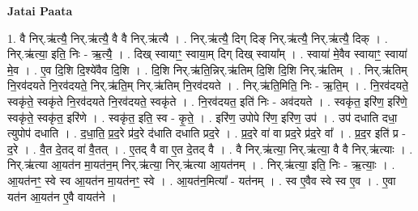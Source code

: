 \documentclass[17pt]{extarticle}
\begin{document}
\textbf{Jatai Paata} \newline

1. वै निर्.ऋ॑त्यै॒ निर्.ऋ॑त्यै॒ वै वै निर्.ऋ॑त्यै । . निर्.ऋ॑त्यै॒ दिग् दिङ् निर्.ऋ॑त्यै॒ निर्.ऋ॑त्यै॒ दिक् । . निर्.ऋ॑त्या॒ इति॒ निः - ऋ॒त्यै॒ । . दिख् स्वायाꣳ॒॒ स्वाया॒म् दिग् दिख् स्वाया᳚म् । . स्वाया॑ मे॒वैव स्वायाꣳ॒॒ स्वाया॑ मे॒व । . ए॒व दि॒शि दि॒श्ये॑वैव दि॒शि । . दि॒शि निर्.ऋ॑ति॒न्निर्.ऋ॑तिम् दि॒शि दि॒शि निर्.ऋ॑तिम् । . निर्.ऋ॑तिम् नि॒रव॑दयते नि॒रव॑दयते॒ निर्.ऋ॑ति॒म् निर्.ऋ॑तिम् नि॒रव॑दयते । . निर्.ऋ॑ति॒मिति॒ निः - ऋ॒ति॒म् । . नि॒रव॑दयते॒ स्वकृ॑ते॒ स्वकृ॑ते नि॒रव॑दयते नि॒रव॑दयते॒ स्वकृ॑ते । . नि॒रव॑दयत॒ इति॑ निः - अव॑दयते । . स्वकृ॑त॒ इरि॑ण॒ इरि॑णे॒ स्वकृ॑ते॒ स्वकृ॑त॒ इरि॑णे । . स्वकृ॑त॒ इति॒ स्व - कृ॒ते॒ । . इरि॑ण॒ उपोपे रि॑ण॒ इरि॑ण॒ उप॑ । . उप॑ दधाति दधा॒ त्युपोप॑ दधाति । . द॒धा॒ति॒ प्र॒द॒रे प्र॑द॒रे द॑धाति दधाति प्रद॒रे । . प्र॒द॒रे वा॑ वा प्रद॒रे प्र॑द॒रे वा᳚ । . प्र॒द॒र इति॑ प्र - द॒रे । . वै॒त दे॒तद् वा॑ वै॒तत् । . ए॒तद् वै वा ए॒त दे॒तद् वै । . वै निर्.ऋ॑त्या॒ निर्.ऋ॑त्या॒ वै वै निर्.ऋ॑त्याः । . निर्.ऋ॑त्या आ॒यत॑न मा॒यत॑न॒म् निर्.ऋ॑त्या॒ निर्.ऋ॑त्या आ॒यत॑नम् । . निर्.ऋ॑त्या॒ इति॒ निः - ऋ॒त्याः॒ । . आ॒यत॑नꣳ॒॒ स्वे स्व आ॒यत॑न मा॒यत॑नꣳ॒॒ स्वे । . आ॒यत॑न॒मित्या᳚ - यत॑नम् । . स्व ए॒वैव स्वे स्व ए॒व । . ए॒वा यत॑न आ॒यत॑न ए॒वै वायत॑ने । \newline
\end{document}
